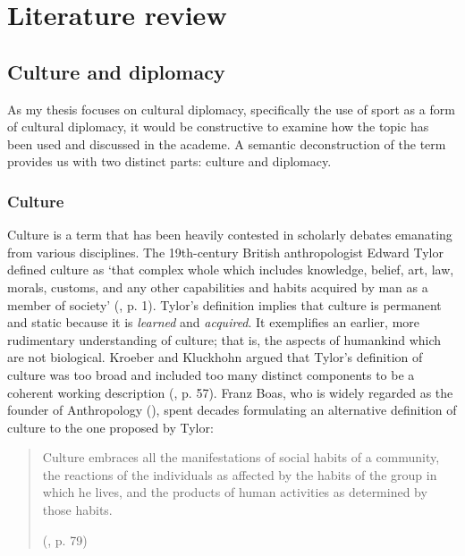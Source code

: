 \chapter{Literature review\label{cha:litreivew}}

\section{Culture and diplomacy}

As my thesis focuses on cultural diplomacy, specifically the use of sport as a form of cultural diplomacy, it would be constructive to examine how the topic has been used and discussed in the academe. A semantic deconstruction of the term provides us with two distinct parts: culture and diplomacy. 

\subsection{Culture}

Culture is a term that has been heavily contested in scholarly debates emanating from various disciplines. The 19th-century British anthropologist Edward Tylor defined culture as ‘that complex whole which includes knowledge, belief, art, law, morals, customs, and any other capabilities and habits acquired by man as a member of society’ (\cite{tylor1958}, p. 1). Tylor’s definition implies that culture is permanent and static because it is \emph{learned} and \emph{acquired}. It exemplifies an earlier, more rudimentary understanding of culture; that is, the aspects of humankind which are not biological. Kroeber and Kluckhohn argued that Tylor’s definition of culture was too broad and included too many distinct components to be a coherent working description (\cite{kuper1999}, p. 57). Franz Boas, who is widely regarded as the founder of Anthropology (\cite{stocking1960}), spent decades formulating an alternative definition of culture to the one proposed by Tylor:

\begin{quote}
    Culture embraces all the manifestations of social habits of a community, the reactions of the individuals as affected by the habits of the group in which he lives, and the products of human activities as determined by those habits. 
    
    \begin{flushright}
    (\cite{boas1930}, p. 79)
    \end{flushright}
\end{quote}

